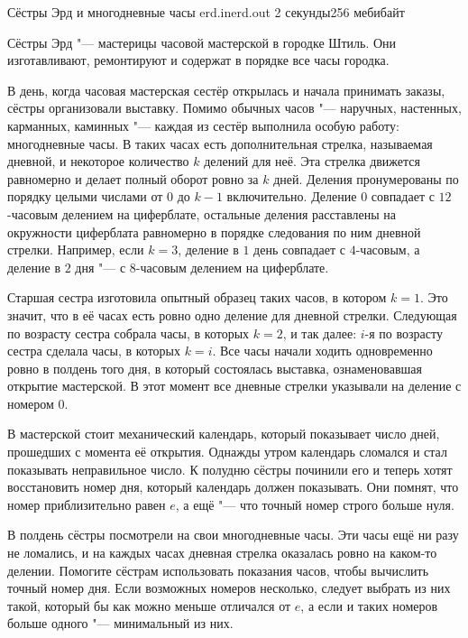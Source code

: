 \gdef\thisproblemauthor{Иван Казменко}
\gdef\thisproblemdeveloper{Иван Казменко}
\begin{problem}{Сёстры Эрд и многодневные часы}
{erd.in}{erd.out}
{2 секунды}{256 мебибайт}{}

Сёстры Эрд "--- мастерицы часовой мастерской в городке Штиль.
Они изготавливают, ремонтируют и содержат в порядке все часы городка.

В день, когда часовая мастерская сестёр открылась и начала принимать
заказы, сёстры организовали выставку.
Помимо обычных часов "--- наручных, настенных, карманных, каминных "---
каждая из сестёр выполнила особую работу: многодневные часы.
В таких часах есть дополнительная стрелка, называемая дневной,
и некоторое количество $k$ делений для неё.
Эта стрелка движется равномерно и делает полный оборот ровно за $k$ дней.
Деления пронумерованы по порядку целыми числами от $0$ до $k - 1$
включительно.
Деление $0$ совпадает с $12$-часовым делением на циферблате,
остальные деления расставлены на окружности циферблата равномерно
в порядке следования по ним дневной стрелки.
Например, если $k = 3$, деление в $1$ день совпадает с $4$-часовым,
а деление в $2$ дня "--- с $8$-часовым делением на циферблате.

Старшая сестра изготовила опытный образец таких часов, в котором $k = 1$.
Это значит, что в её часах есть ровно одно деление для дневной стрелки.
Следующая по возрасту сестра собрала часы, в которых $k = 2$,
и так далее: $i$-я по возрасту сестра сделала часы, в которых $k = i$.
Все часы начали ходить одновременно ровно в полдень того дня,
в который состоялась выставка, ознаменовавшая открытие мастерской.
В этот момент все дневные стрелки указывали на деление с номером $0$.

В мастерской стоит механический календарь, который показывает число дней,
прошедших с момента её открытия.
Однажды утром календарь сломался и стал показывать неправильное число.
К полудню сёстры починили его и теперь хотят восстановить номер дня,
который календарь должен показывать.
Они помнят, что номер приблизительно равен $e$,
а ещё "--- что точный номер строго больше нуля.

В полдень сёстры посмотрели на свои многодневные часы.
Эти часы ещё ни разу не ломались, и на каждых часах дневная стрелка
оказалась ровно на каком-то делении.
Помогите сёстрам использовать показания часов,
чтобы вычислить точный номер дня.
Если возможных номеров несколько, следует выбрать из них такой,
который бы как можно меньше отличался от $e$,
а если и таких номеров больше одного "--- минимальный из них.


\end{problem}
